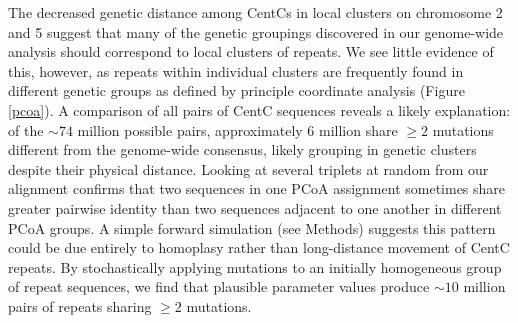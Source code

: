 The decreased genetic distance among CentCs in local clusters on chromosome 2 and 5 suggest that many of the genetic groupings discovered in our genome-wide analysis should correspond to local clusters of repeats. We see little evidence of this, however, as repeats within individual clusters are frequently found in different genetic groups as defined by principle coordinate analysis (Figure \ref{pcoa}).  A comparison of all pairs of CentC sequences reveals a likely explanation: of the $\sim 74$ million possible pairs,  approximately 6 million share $\geq 2$ mutations different from the genome-wide consensus, likely grouping in genetic clusters despite their physical distance.  Looking at several triplets at random from our alignment confirms that two sequences in one PCoA assignment sometimes share greater pairwise identity than two sequences adjacent to one another in different PCoA groups.  A simple forward simulation (see Methods) suggests this pattern could be due entirely to homoplasy rather than long-distance movement of CentC repeats.  By stochastically applying mutations to an initially homogeneous group of repeat sequences, we find that plausible parameter values produce $\sim 10$ million pairs of repeats sharing $\geq 2$ mutations.

